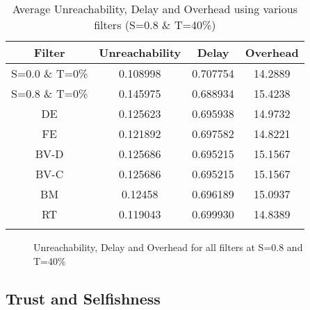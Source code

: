 \documentclass[10pt,conference]{IEEEtran}
\begin{document}
\begin{table}[htp]
\begin{center}
\begin{tabular}{c c c c}
\hline Filter & Unreachability & Delay & Overhead\\
\hline S=0.0 \& T=0\% &0.108998 &0.707754 &14.2889	\\
 S=0.8 \& T=0\% &0.145975&0.688934&15.4238\\
DE &0.125623&0.695938&14.9732\\
FE &0.121892&0.697582&14.8221\\
BV-D &0.125686&0.695215&15.1567\\
BV-C &0.125686&0.695215&15.1567\\
BM   & 0.12458 & 0.696189 & 15.0937\\
RT &0.119043&0.699930&14.8389\\

\hline \\
\end{tabular}\end{center} 
\caption{Average Unreachability, Delay and Overhead using various filters (S=0.8 \& T=40\%)}
\label{tab:all_filter}
\end{table}

	





\begin{figure*}
  \begin{center}
\renewcommand{\thesubfigure}{\Alph{subfigure}.}

    \centering
    
     
    \caption{Unreachability, Delay and Overhead for all filters at S=0.8 and T=40\%}
    \label{fig:all_filters}
  \end{center}
\end{figure*}



\subsection{Trust and Selfishness}
\end{document}
